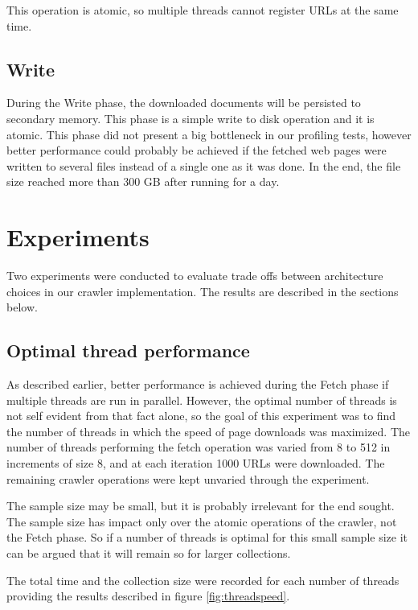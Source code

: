 \documentclass{report}
\begin{document}
This operation is atomic, so multiple threads cannot register URLs at the same time.

\section{Write}

During the Write phase, the downloaded documents will be persisted to secondary memory. This phase is
a simple write to disk operation and it is atomic. This phase did not present a big bottleneck in our
profiling tests, however better performance could probably be achieved if the fetched web pages were written to
several files instead of a single one as it was done. In the end, the file size reached more than 
300 GB after running for a day.

\chapter{Experiments}

Two experiments were conducted to evaluate trade offs between architecture choices in our crawler
implementation. The results are described in the sections below.

\section{Optimal thread performance}
As described earlier, better performance is achieved during the Fetch phase if multiple threads are run
in parallel. However, the optimal number of threads is not self evident from that fact alone, so 
the goal of this experiment was to find the number of threads in which the speed of page downloads was maximized.
The number of threads performing the fetch operation was varied from 8 to 512 in increments of size 8, and at
each iteration 1000 URLs were downloaded. The remaining crawler operations were kept unvaried through the 
experiment.

The sample size may be small, but it is probably irrelevant for the end sought. The sample size has impact
only over the atomic operations of the crawler, not the Fetch phase. So if a number of threads is optimal for
this small sample size it can be argued that it will remain so for larger collections.

The total time and the collection size were recorded for each number of threads providing the results described in
figure \ref{fig:threadspeed}.
\end{document}
